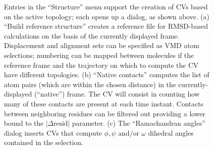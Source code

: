 \documentclass[preprint,12pt]{elsarticle}
\begin{document}
\begin{figure}\label{fig:structure}
  \centering
  \caption{Entries in the ``Structure'' menu support the creation of
    CVs based on the active topology; each opens up a dialog, as shown
    above. (a) ``Build reference structure'' creates a reference file
    for RMSD-based calculations on the basis of the currently
    displayed frame. Displacement and alignment sets can be specified
    as VMD atom selections; numbering can be mapped between molecules
    if the reference frame and the trajectory on which to compute the
    CV have different topologies. (b) ``Native contacts'' computes the
    list of atom pairs (which are within the chosen distance) in the
    currently-displayed (``native'') frame. The CV will consist in
    counting how many of these contacts are present at each time
    instant.  Contacts between neighboring residues can be filtered
    out providing a lower bound to the $| \Delta \mbox{resid} |$
    parameter. (c) The ``Ramachandran angles'' dialog inserts CVs that
    compute $\phi, \psi$ and/or $\omega$ dihedral angles contained in
    the selection.}
\end{figure}
\end{document}
